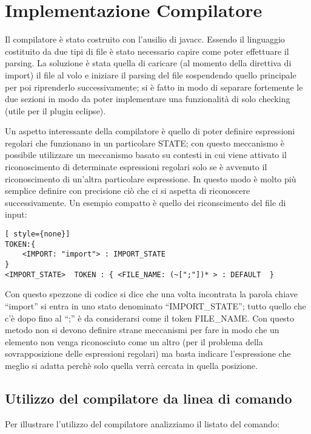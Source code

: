 \section{Implementazione Compilatore}

Il compilatore è stato costruito con l'ausilio di javacc. Essendo il linguaggio
costituito da due tipi di file è stato necessario capire come poter effettuare
il parsing. La soluzione è stata quella di caricare (al momento della direttiva
di import) il file al volo e iniziare il parsing del file sospendendo
quello principale per poi riprenderlo successivamente; si è fatto in modo di
separare fortemente le due sezioni in modo da poter implementare una
funzionalità di solo checking (utile per il plugin eclipse).

Un aspetto interessante della compilatore è quello di poter definire espressioni
regolari che funzionano in un particolare STATE; con questo meccanismo è
possibile utilizzare un meccanismo basato su contesti in cui viene attivato il
riconoscimento di determinate espressioni regolari solo se è avvenuto il
riconoscimento di un'altra particolare espressione. In questo modo è molto più
semplice definire con precisione ciò che ci si aspetta di riconoscere
successivamente. Un esempio compatto è quello dei riconscimento del file di
input: 


\begin{lstlisting}[ style={none}]
TOKEN:{
	<IMPORT: "import"> : IMPORT_STATE
}
<IMPORT_STATE>  TOKEN : { <FILE_NAME: (~[";"])* > : DEFAULT  }
\end{lstlisting}

Con questo spezzone di codice si dice che una volta incontrata la parola chiave
``import'' si entra in uno stato denominato ``IMPORT\_STATE''; tutto quello che
c'è dopo fino al ``;'' è da considerarsi come il token FILE\_NAME. Con questo
metodo non si devono definire strane meccanismi per fare in modo che un elemento non
venga riconosciuto come un altro (per il problema della sovrapposizione delle
espressioni regolari) ma basta indicare l'espressione che meglio si adatta
perchè solo quella verrà cercata in quella posizione.

\subsection{Utilizzo del compilatore da linea di comando}

Per illustrare l'utilizzo del compilatore analizziamo il listato del comando:

